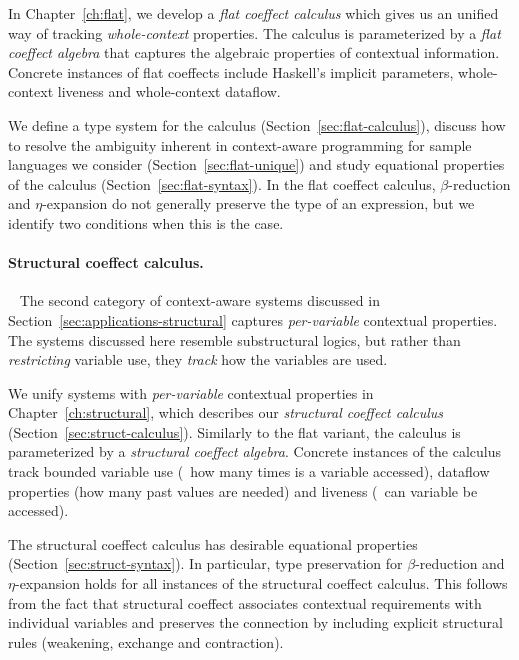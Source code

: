 In Chapter~\ref{ch:flat}, we develop a \emph{flat coeffect calculus} which gives us an unified way
of tracking \emph{whole-context} properties. The calculus is parameterized by a \emph{flat coeffect
algebra} that captures the algebraic properties of contextual information. Concrete
instances of flat coeffects include Haskell's implicit parameters, whole-context liveness and
whole-context dataflow.

We define a type system for the calculus (Section~\ref{sec:flat-calculus}),
discuss how to resolve the ambiguity inherent in context-aware programming for sample
languages we consider (Section~\ref{sec:flat-unique}) and study equational properties of the
calculus (Section~\ref{sec:flat-syntax}). In the flat coeffect calculus, $\beta$-reduction and
$\eta$-expansion do not generally preserve the type of an expression, but we identify two
conditions when this is the case.


\paragraph{Structural coeffect calculus.}

~ The second category of context-aware systems discussed in Section~\ref{sec:applications-structural}
captures \emph{per-variable} contextual properties. The systems discussed here resemble substructural
logics, but rather than \emph{restricting} variable use, they \emph{track} how the variables are used.

We unify systems with \emph{per-variable} contextual properties in Chapter~\ref{ch:structural},
which describes our \emph{structural coeffect calculus} (Section~\ref{sec:struct-calculus}).
Similarly to the flat variant, the calculus is parameterized by a \emph{structural coeffect algebra}.
Concrete instances of the calculus track bounded variable use (\ie~how many times is a variable
accessed), dataflow properties (how many past values are needed) and liveness (\ie~can variable
be accessed).

The structural coeffect calculus has desirable equational properties (Section~\ref{sec:struct-syntax}).
In particular, type preservation for $\beta$-reduction and $\eta$-expansion holds for all instances of the
structural coeffect calculus. This follows from the fact that structural coeffect
associates contextual requirements with individual variables and preserves the connection by
including explicit structural rules (weakening, exchange and contraction).

